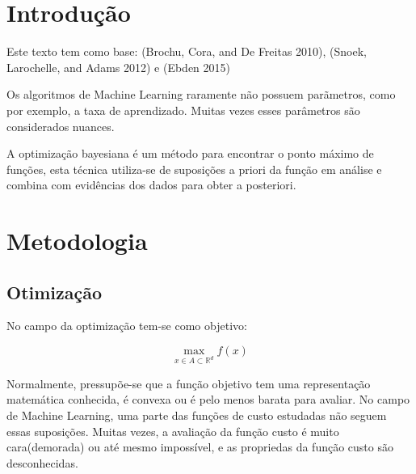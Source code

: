 \documentclass[
	12pt,				%
	openright,			%
	twoside,			%
	a4paper,			%
	english,			%
	french,				%
	spanish,			%
	brazil,				%
]{abntex2}
\begin{document}
\listoftables*
\cleardoublepage

\tableofcontents*
\cleardoublepage

\textual

\hypertarget{introduuxe7uxe3o}{%
\chapter*{Introdução}\label{introduuxe7uxe3o}}

Este texto tem como base: (Brochu, Cora, and De Freitas 2010), (Snoek,
Larochelle, and Adams 2012) e (Ebden 2015)

Os algoritmos de Machine Learning raramente não possuem parãmetros, como
por exemplo, a taxa de aprendizado. Muitas vezes esses parâmetros são
considerados nuances.

A optimização bayesiana é um método para encontrar o ponto máximo de
funções, esta técnica utiliza-se de suposições a priori da função em
análise e combina com evidências dos dados para obter a posteriori. ~

\hypertarget{metodologia}{%
\chapter{Metodologia}\label{metodologia}}

\hypertarget{otimizauxe7uxe3o}{%
\section{Otimização}\label{otimizauxe7uxe3o}}

No campo da optimização tem-se como objetivo:

\[
\max\limits_{{x \in A \subset \mathbb{R}^d}} f(x)
\]

Normalmente, pressupõe-se que a função objetivo tem uma representação
matemática conhecida, é convexa ou é pelo menos barata para avaliar. No
campo de Machine Learning, uma parte das funções de custo estudadas não
seguem essas suposições. Muitas vezes, a avaliação da função custo é
muito cara(demorada) ou até mesmo impossível, e as propriedas da função
custo são desconhecidas.\\
\end{document}
